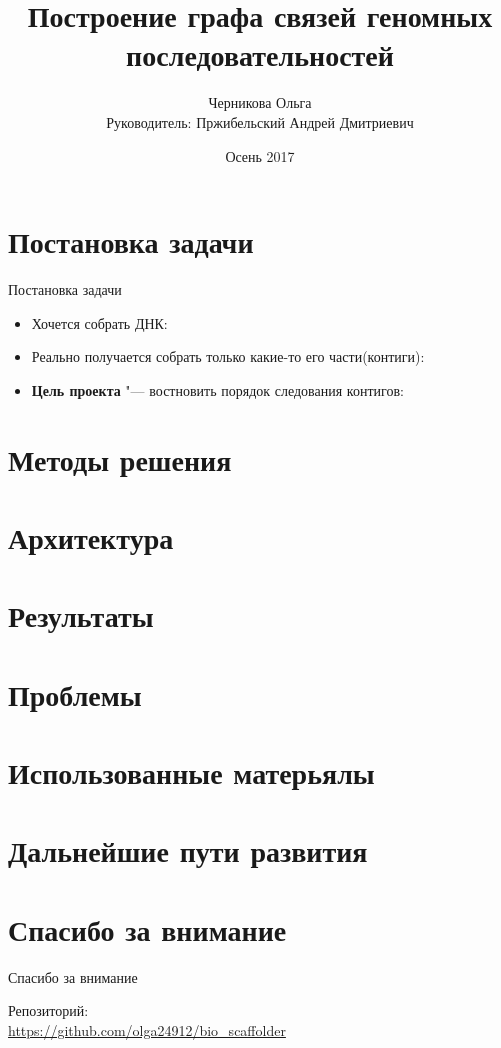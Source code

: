 \documentclass{beamer}
\title[Граф связей между контигами]{Построение графа связей геномных последовательностей}
\author[Черникова Ольга]{Черникова Ольга\\
	Руководитель: Пржибельский Андрей Дмитриевич}
\institute{СПб АУ РАН}
\date{Осень 2017}
\newcommand{\cimg}[2]{%
	\begin{center}%
		\ifthenelse{\equal{#2}{}}{%
			\texttt{[image: \#1]}
		}{%
			\texttt{[image: \#1]}
		}%
	\end{center}%
}
\begin{document}
\begin{frame}
	\titlepage
\end{frame}

\section{Постановка задачи}

\begin{frame}[t]{Постановка задачи}
	\begin{itemize}
		\item Хочется собрать ДНК:
		\cimg{p1_1.png}{1}
		\item Реально получается собрать только какие-то его части(контиги):
		\cimg{p1_2.png}{0.25}
		\item \textbf{Цель проекта} "--- востновить порядок следования контигов:
		\cimg{p1_3.png}{1} 
	\end{itemize}
\end{frame}

\section{Методы решения}

\section{Архитектура}

\section{Результаты}

\section{Проблемы}

\section{Использованные матерьялы}

\section{Дальнейшие пути развития}

\section{Спасибо за внимание}
\begin{frame}{Спасибо за внимание}
    \begin{center}
        Репозиторий: \\ \url{https://github.com/olga24912/bio_scaffolder}
    \end{center}
\end{frame}
\end{document}
